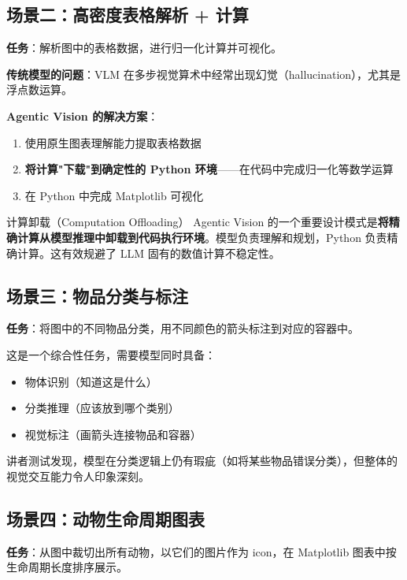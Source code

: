 \documentclass[a4paper]{article}
\begin{document}
\subsection{场景二：高密度表格解析 + 计算}

\textbf{任务}：解析图中的表格数据，进行归一化计算并可视化。

\textbf{传统模型的问题}：VLM 在多步视觉算术中经常出现幻觉（hallucination），尤其是浮点数运算。

\textbf{Agentic Vision 的解决方案}：
\begin{enumerate}
    \item 使用原生图表理解能力提取表格数据
    \item \textbf{将计算"下载"到确定性的 Python 环境}——在代码中完成归一化等数学运算
    \item 在 Python 中完成 Matplotlib 可视化
\end{enumerate}

\begin{importantbox}{计算卸载（Computation Offloading）}
Agentic Vision 的一个重要设计模式是\textbf{将精确计算从模型推理中卸载到代码执行环境}。模型负责理解和规划，Python 负责精确计算。这有效规避了 LLM 固有的数值计算不稳定性。
\end{importantbox}

\subsection{场景三：物品分类与标注}

\textbf{任务}：将图中的不同物品分类，用不同颜色的箭头标注到对应的容器中。

这是一个综合性任务，需要模型同时具备：
\begin{itemize}
    \item 物体识别（知道这是什么）
    \item 分类推理（应该放到哪个类别）
    \item 视觉标注（画箭头连接物品和容器）
\end{itemize}

讲者测试发现，模型在分类逻辑上仍有瑕疵（如将某些物品错误分类），但整体的视觉交互能力令人印象深刻。

\subsection{场景四：动物生命周期图表}

\textbf{任务}：从图中裁切出所有动物，以它们的图片作为 icon，在 Matplotlib 图表中按生命周期长度排序展示。
\end{document}
